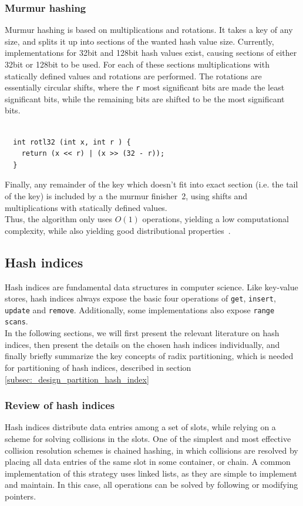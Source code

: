 \documentclass[11pt]{article} %
\begin{document}
\subsubsection{Murmur hashing}
\label{subsubsec:murmur_hashing}
Murmur hashing is based on multiplications and rotations. It takes a key of any size, and splits it up into sections of the wanted hash value size. Currently, implementations for 32bit and 128bit hash values exist, causing sections of either 32bit or 128bit to be used. For each of these sections multiplications with statically defined values and rotations are performed. The rotations are essentially circular shifts, where the \verb|r| most significant bits are made the least significant bits, while the remaining bits are shifted to be the most significant bits.
\\
\begin{lstlisting}[frame=single]  % Start your code-block

  int rotl32 (int x, int r ) {
    return (x << r) | (x >> (32 - r));
  }
\end{lstlisting}
Finally, any remainder of the key which doesn't fit into exact section (i.e. the tail of the key) is included by a the murmur finisher~\cite{mur3}2, using shifts and multiplications with statically defined values.\\

Thus, the algorithm only uses $O(1)$ operations, yielding a low computational complexity, while also yielding  good distributional properties~\cite{RAD15}.
\subsection{Hash indices}
\label{subsec:background_hashing_indices}
Hash indices are fundamental data structures in computer science. Like key-value stores, hash indices always expose the basic four operations of \verb|get|, \verb|insert|, \verb|update| and \verb|remove|. Additionally, some implementations also expose \verb|range scans|. \\

In the following sections, we will first present the relevant literature on hash indices, then present the details on the chosen hash indices individually, and finally briefly summarize the key concepts of radix partitioning, which is needed for partitioning of hash indices, described in section \ref{subsec:_design_partition_hash_index}

\subsubsection{Review of hash indices}
\label{subsubsec:background_review_of_hash_indices}
Hash indices distribute data entries among a set of slots, while relying on a scheme for solving collisions in the slots. One of the simplest and most effective collision resolution schemes is chained hashing, in which collisions are resolved by placing all data entries of the same slot in some container, or chain. A common implementation of this strategy uses linked lists, as they are simple to implement and maintain. In this case, all operations can be solved by following or modifying pointers. \\
\end{document}

